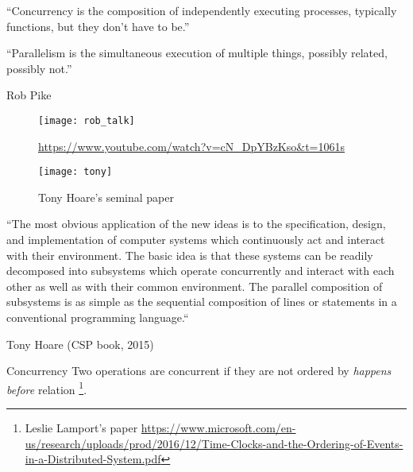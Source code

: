 \documentclass[10pt]{beamer}
\begin{document}
\begin{frame}[fragile]
	``Concurrency is the composition of independently executing processes, typically functions, but they don't have to be.''

	``Parallelism is the simultaneous execution of multiple things, possibly related, possibly not.''

Rob Pike

\end{frame}
\begin{frame}[fragile]
	\begin{figure}
		\texttt{[image: rob\_talk]}
		\caption{\url{https://www.youtube.com/watch?v=cN_DpYBzKso&t=1061s}}
	\end{figure}
\end{frame}

\begin{frame}[fragile]
	\begin{figure}
		\texttt{[image: tony]}
		\caption{Tony Hoare's seminal paper}
	\end{figure}
\end{frame}
\begin{frame}[fragile]
``The most obvious application of the new ideas is to the specification, design,
and implementation of computer systems which continuously act and
interact with their environment. The basic idea is that these systems can be
readily decomposed into subsystems which operate concurrently and interact
with each other as well as with their common environment. The parallel composition
of subsystems is as simple as the sequential composition of lines or
statements in a conventional programming language.``

	Tony Hoare (CSP book, 2015)
\end{frame}



\begin{frame}[fragile]
	\begin{alertblock}{Concurrency}
		Two operations are concurrent if they are not ordered by \emph{happens before} relation%
		\footnote{Leslie Lamport's paper \url{https://www.microsoft.com/en-us/research/uploads/prod/2016/12/Time-Clocks-and-the-Ordering-of-Events-in-a-Distributed-System.pdf}}.
	\end{alertblock}
	

\end{frame}
\end{document}
